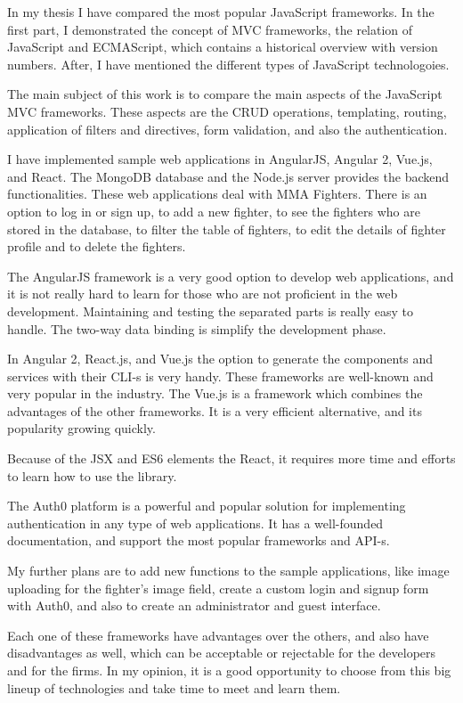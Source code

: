 
In my thesis I have compared the most popular JavaScript frameworks. In the first part, I demonstrated the concept of MVC frameworks, the relation of JavaScript and ECMAScript, which contains a historical overview with version numbers. After, I have mentioned the different types of JavaScript technologoies.

The main subject of this work is to compare the main aspects of the JavaScript MVC frameworks. These aspects are the CRUD operations, templating, routing, application of filters and directives, form validation, and also the authentication.

I have implemented sample web applications in AngularJS, Angular 2, Vue.js, and React. The MongoDB database and the Node.js server provides the backend functionalities. These web applications deal with MMA Fighters. There is an option to log in or sign up, to add a new fighter, to see the fighters who are stored in the database, to filter the table of fighters, to edit the details of fighter profile and to delete the fighters.

The AngularJS framework is a very good option to develop web applications, and it is not really hard to learn for those who are not proficient in the web development. Maintaining and testing the separated parts is really easy to handle. The two-way data binding is simplify the development phase. 

In Angular 2, React.js, and Vue.js the option to generate the components and services with their CLI-s is very handy. These frameworks are well-known and very popular in the industry. The Vue.js is a framework which combines the advantages of the other frameworks. It is a very efficient alternative, and its popularity growing quickly.

Because of the JSX and ES6 elements the React, it requires more time and efforts to learn how to use the library.

The Auth0 platform is a powerful and popular solution for implementing authentication in any type of web applications. It has a well-founded documentation, and support the most popular frameworks and API-s.

My further plans are to add new functions to the sample applications, like image uploading for the fighter's image field, create a custom login and signup form with Auth0, and also to create an administrator and guest interface.

Each one of these frameworks have advantages over the others, and also have disadvantages as well, which can be acceptable or rejectable for the developers and for the firms. In my opinion, it is a good opportunity to choose from this big lineup of technologies and take time to meet and learn them. 
